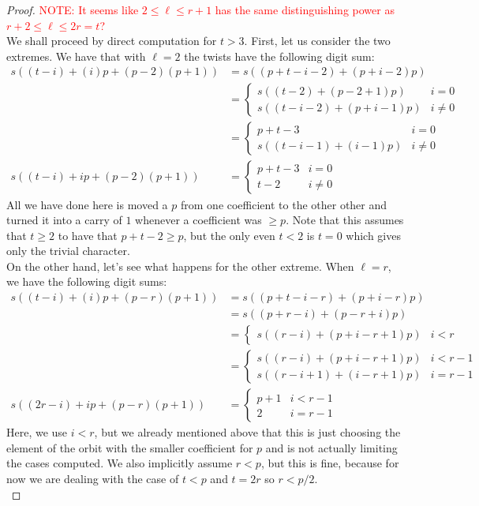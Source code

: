 \begin{proof}
\textcolor{red}{NOTE: It seems like $2 \leq \ell \leq r+1$ has the same distinguishing power as $r+2 \leq \ell \leq 2r=t$?}
\\

We shall proceed by direct computation for $t > 3$.
First, let us consider the two extremes. 
We have that with $\ell = 2$ the twists have the following digit sum:
\begin{align*}
 s((t-i) + (i)p + (p - 2)(p+1)) &= s((p + t - i - 2) + (p + i -2)p) \\ 
 &= \begin{cases}
   s((t-2) + (p-2+1)p) & i = 0 \\
   s((t-i-2) + (p+i-1)p)& i \neq 0
 \end{cases} \\
 &= \begin{cases}
   p+t - 3 & i = 0 \\
   s((t-i-1)+(i-1)p) & i \neq 0
 \end{cases} \\
 s((t-i) + ip + (p - 2)(p+1)) &= \begin{cases}
   p+t - 3 & i = 0 \\
   t-2 & i \neq 0
 \end{cases}
\end{align*}
All we have done here is moved a $p$ from one coefficient to the other other and turned it into a carry of $1$ whenever a coefficient was $\geq p$. 
Note that this assumes that $t \geq 2$ to have that $p+t-2 \geq p$, but the only even $t < 2$ is $t =0$ which gives only the trivial character.
\\

On the other hand, let's see what happens for the other extreme. 
When $\ell = r$, we have the following digit sums:
\begin{align*}
 s((t-i) + (i)p + (p - r)(p+1)) &= s((p + t- i - r) +(p + i -r) p) \\ 
 &=s((p + r - i) + (p -r + i)p) \\
 &= \begin{cases}
s((r-i) + (p+i-r+1)p) & i < r
 \end{cases} \\
 &= \begin{cases}
s((r-i) + (p+i-r+1)p) & i < r-1 \\
 s((r-i+1) + (i-r+1)p) & i = r-1
 \end{cases} \\
  s((2r-i) + ip + (p - r)(p+1)) &= \begin{cases}
p+1 & i < r-1 \\
2 & i = r-1
 \end{cases}
\end{align*}
Here, we use $i < r$, but we already mentioned above that this is just choosing the element of the orbit with the smaller coefficient for $p$ and is not actually limiting the cases computed. 
We also implicitly assume $r < p$, but this is fine, because for now we are dealing with the case of $t < p$ and $t = 2r$ so $ r < p/2$.
\\


\end{proof}

